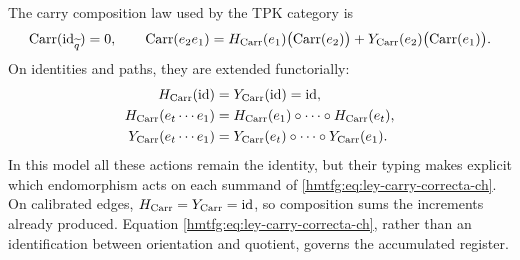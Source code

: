 The carry composition law used by the TPK category is
\begin{equation}
 \operatorname{Carr}(\operatorname{id}_{\widetilde q})=0,\qquad
 \operatorname{Carr}(e_2e_1)
 =H_{\rm Carr}(e_1)\bigl(\operatorname{Carr}(e_2)\bigr)
  +Y_{\rm Carr}(e_2)\bigl(\operatorname{Carr}(e_1)\bigr).
 \label{hmtfg:eq:ley-carry-correcta-ch}
\end{equation}
On identities and paths, they are extended functorially:
\[
\begin{aligned}
 H_{\rm Carr}(\operatorname{id})
   &=Y_{\rm Carr}(\operatorname{id})=\operatorname{id},\\
 H_{\rm Carr}(e_t\cdots e_1)
   &=H_{\rm Carr}(e_1)\circ\cdots\circ H_{\rm Carr}(e_t),\\
 Y_{\rm Carr}(e_t\cdots e_1)
   &=Y_{\rm Carr}(e_t)\circ\cdots\circ Y_{\rm Carr}(e_1).
\end{aligned}
\]
In this model all these actions remain the identity, but
their typing makes explicit which endomorphism acts on each summand of
\eqref{hmtfg:eq:ley-carry-correcta-ch}.
On calibrated edges, \(H_{\rm Carr}=Y_{\rm Carr}=\operatorname{id}\),
so composition sums the increments already produced. Equation
\eqref{hmtfg:eq:ley-carry-correcta-ch}, rather than an identification between orientation and
quotient, governs the accumulated register.

